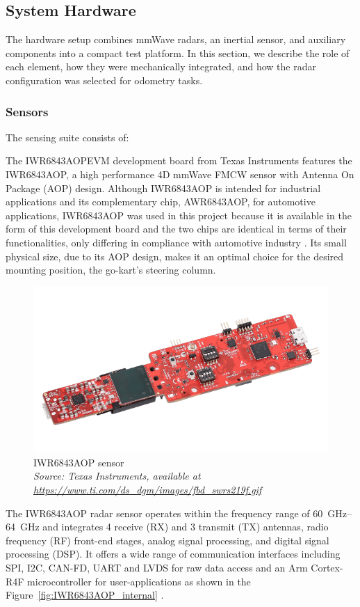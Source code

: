 \subsection{System Hardware}

The hardware setup combines mmWave radars, an inertial sensor, and auxiliary components into a compact test platform.  
In this section, we describe the role of each element, how they were mechanically integrated, and how the radar configuration was selected for odometry tasks.  

\subsubsection{Sensors}
The sensing suite consists of:  

The IWR6843AOPEVM development board from Texas Instruments features the IWR6843AOP, a high performance 4D mmWave FMCW sensor with Antenna On Package (AOP) design.
Although IWR6843AOP is intended for industrial applications and its complementary chip, AWR6843AOP, for automotive applications, IWR6843AOP was used in this project because it is available in the form of this development board and the two chips are identical in terms of their functionalities, only differing in compliance with automotive  industry \cite{iwr_awr_diff}.
Its small physical size, due to its AOP design, makes it an optimal choice for the desired mounting position, the go-kart's steering column.
\begin{figure}[!htbp]
    \centering
    \includegraphics[width=0.7\linewidth]{images/iwr6843aopevm-angled.png}
    \caption{IWR6843AOP sensor\\
    \textit{Source: Texas Instruments, available at \url{https://www.ti.com/ds_dgm/images/fbd_swrs219f.gif}}}
    \label{fig:IWR6843AOP sensor}
\end{figure}

\par
The IWR6843AOP radar sensor operates within the frequency range of \SIrange{60}{64}{\giga\hertz} and integrates 4 receive (RX) and 3 transmit (TX) antennas, radio frequency (RF) front-end stages, analog signal processing, and digital signal processing (DSP).
It offers a wide range of communication interfaces including SPI, I2C, CAN-FD, UART and LVDS for raw data access and an Arm Cortex-R4F microcontroller for user-applications as shown in the Figure~\ref{fig:IWR6843AOP_internal} \cite{dev_board_page}.

